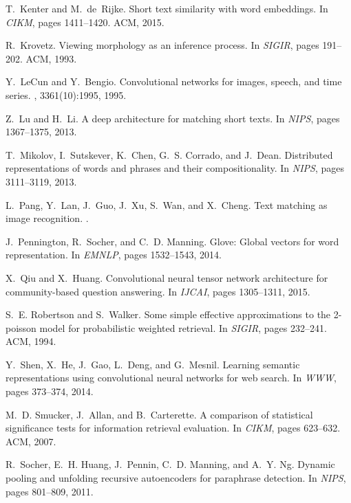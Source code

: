\documentclass{sig-alternate-05-2015}
\begin{document}
{\begin{thebibliography}{10}
T.~Kenter and M.~de~Rijke.
\newblock Short text similarity with word embeddings.
\newblock In {\em CIKM}, pages 1411--1420. ACM, 2015.

R.~Krovetz.
\newblock Viewing morphology as an inference process.
\newblock In {\em SIGIR}, pages 191--202. ACM, 1993.

Y.~LeCun and Y.~Bengio.
\newblock Convolutional networks for images, speech, and time series.
,
  3361(10):1995, 1995.

Z.~Lu and H.~Li.
\newblock A deep architecture for matching short texts.
\newblock In {\em NIPS}, pages 1367--1375, 2013.

T.~Mikolov, I.~Sutskever, K.~Chen, G.~S. Corrado, and J.~Dean.
\newblock Distributed representations of words and phrases and their
  compositionality.
\newblock In {\em NIPS}, pages 3111--3119, 2013.

L.~Pang, Y.~Lan, J.~Guo, J.~Xu, S.~Wan, and X.~Cheng.
\newblock Text matching as image recognition.
.

J.~Pennington, R.~Socher, and C.~D. Manning.
\newblock Glove: Global vectors for word representation.
\newblock In {\em EMNLP}, pages 1532--1543, 2014.

X.~Qiu and X.~Huang.
\newblock Convolutional neural tensor network architecture for community-based
  question answering.
\newblock In {\em IJCAI}, pages 1305--1311, 2015.

S.~E. Robertson and S.~Walker.
\newblock Some simple effective approximations to the 2-poisson model for
  probabilistic weighted retrieval.
\newblock In {\em SIGIR}, pages 232--241. ACM, 1994.

Y.~Shen, X.~He, J.~Gao, L.~Deng, and G.~Mesnil.
\newblock Learning semantic representations using convolutional neural networks
  for web search.
\newblock In {\em WWW}, pages 373--374, 2014.

M.~D. Smucker, J.~Allan, and B.~Carterette.
\newblock A comparison of statistical significance tests for information
  retrieval evaluation.
\newblock In {\em CIKM}, pages 623--632. ACM, 2007.

R.~Socher, E.~H. Huang, J.~Pennin, C.~D. Manning, and A.~Y. Ng.
\newblock Dynamic pooling and unfolding recursive autoencoders for paraphrase
  detection.
\newblock In {\em NIPS}, pages 801--809, 2011.


\end{thebibliography}}
\end{document}
